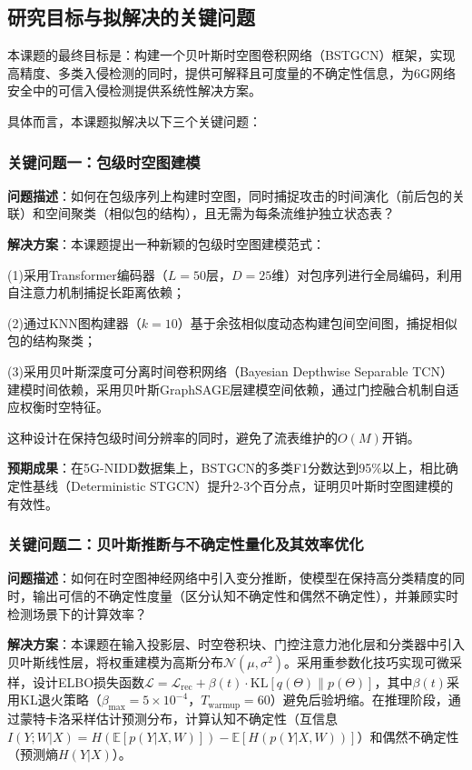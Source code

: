 \subsection{研究目标与拟解决的关键问题}

本课题的最终目标是：构建一个贝叶斯时空图卷积网络（BSTGCN）框架，实现高精度、多类入侵检测的同时，提供可解释且可度量的不确定性信息，为6G网络安全中的可信入侵检测提供系统性解决方案。

具体而言，本课题拟解决以下三个关键问题：

\subsubsection{关键问题一：包级时空图建模}

\textbf{问题描述}：如何在包级序列上构建时空图，同时捕捉攻击的时间演化（前后包的关联）和空间聚类（相似包的结构），且无需为每条流维护独立状态表？

\textbf{解决方案}：本课题提出一种新颖的包级时空图建模范式：

(1)采用Transformer编码器（$L=50$层，$D=25$维）对包序列进行全局编码，利用自注意力机制捕捉长距离依赖；

(2)通过KNN图构建器（$k=10$）基于余弦相似度动态构建包间空间图，捕捉相似包的结构聚类；

(3)采用贝叶斯深度可分离时间卷积网络（Bayesian Depthwise Separable TCN）建模时间依赖，采用贝叶斯GraphSAGE层建模空间依赖，通过门控融合机制自适应权衡时空特征。

这种设计在保持包级时间分辨率的同时，避免了流表维护的$O(M)$开销。

\textbf{预期成果}：在5G-NIDD数据集上，BSTGCN的多类F1分数达到95\%以上，相比确定性基线（Deterministic STGCN）提升2-3个百分点，证明贝叶斯时空图建模的有效性。

\subsubsection{关键问题二：贝叶斯推断与不确定性量化及其效率优化}


\textbf{问题描述}：如何在时空图神经网络中引入变分推断，使模型在保持高分类精度的同时，输出可信的不确定性度量（区分认知不确定性和偶然不确定性），并兼顾实时检测场景下的计算效率？

\textbf{解决方案}：本课题在输入投影层、时空卷积块、门控注意力池化层和分类器中引入贝叶斯线性层，将权重建模为高斯分布$\mathcal{N}(\mu, \sigma^2)$。采用重参数化技巧实现可微采样，设计ELBO损失函数$\mathcal{L} = \mathcal{L}_{\text{rec}} + \beta(t) \cdot \text{KL}[q(\Theta) \| p(\Theta)]$，其中$\beta(t)$采用KL退火策略（$\beta_{\max}=5\times10^{-4}$，$T_{\text{warmup}}=60$）避免后验坍缩。在推理阶段，通过蒙特卡洛采样估计预测分布，计算认知不确定性（互信息$I(Y;W|X) = H(\mathbb{E}[p(Y|X,W)]) - \mathbb{E}[H(p(Y|X,W))]$）和偶然不确定性（预测熵$H(Y|X)$）。

